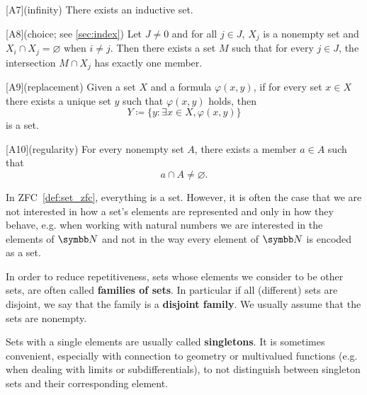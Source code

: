 \begin{definition}
\begin{description}
    [A7](infinity) There exists an inductive set.

    [A8](choice; see \cref{sec:index}) Let \( J \neq 0 \) and for all \( j \in J \), \( X_j \) is a nonempty set and \( X_i \cap X_j = \varnothing \) when \( i \neq j \). Then there exists a set \( M \) such that for every \( j \in J \), the intersection \( M \cap X_j \) has exactly one member.

    [A9](replacement) Given a set \( X \) and a formula \( \varphi(x, y) \), if for every set \( x \in X \) there exists a unique set \( y \) such that \( \varphi(x, y) \) holds, then
    \begin{equation*}
      Y \coloneqq \{ y \colon \exists x \in X, \varphi(x, y) \}
    \end{equation*}
    is a set.

    [A10](regularity) For every nonempty set \( A \), there exists a member \( a \in A \) such that
    \begin{equation*}
      a \cap A \neq \varnothing.
    \end{equation*}
  \end{description}
\end{definition}

\begin{note}\label{note:family_of_sets}
  In ZFC~\cref{def:set_zfc}, everything is a set. However, it is often the case that we are not interested in how a set's elements are represented and only in how they behave, e.g. when working with natural numbers we are interested in the elements of \( \BB{N} \) and not in the way every element of \( \BB{N} \) is encoded as a set.

  In order to reduce repetitiveness, sets whose elements we consider to be other sets, are often called \textbf{families of sets}. In particular if all (different) sets are disjoint, we say that the family is a \textbf{disjoint family}. We usually assume that the sets are nonempty.
\end{note}

\begin{note}\label{note:singleton_sets}
  Sets with a single elements are usually called \textbf{singletons}. It is sometimes convenient, especially with connection to geometry or multivalued functions (e.g. when dealing with limits or subdifferentials), to not distinguish between singleton sets and their corresponding element.
\end{note}

